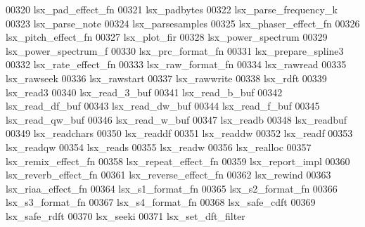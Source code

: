 \begin{DoxyCode}
00320 \textcolor{stringliteral}{lsx\_pad\_effect\_fn}
00321 \textcolor{stringliteral}{lsx\_padbytes}
00322 \textcolor{stringliteral}{lsx\_parse\_frequency\_k}
00323 \textcolor{stringliteral}{lsx\_parse\_note}
00324 \textcolor{stringliteral}{lsx\_parsesamples}
00325 \textcolor{stringliteral}{lsx\_phaser\_effect\_fn}
00326 \textcolor{stringliteral}{lsx\_pitch\_effect\_fn}
00327 \textcolor{stringliteral}{lsx\_plot\_fir}
00328 \textcolor{stringliteral}{lsx\_power\_spectrum}
00329 \textcolor{stringliteral}{lsx\_power\_spectrum\_f}
00330 \textcolor{stringliteral}{lsx\_prc\_format\_fn}
00331 \textcolor{stringliteral}{lsx\_prepare\_spline3}
00332 \textcolor{stringliteral}{lsx\_rate\_effect\_fn}
00333 \textcolor{stringliteral}{lsx\_raw\_format\_fn}
00334 \textcolor{stringliteral}{lsx\_rawread}
00335 \textcolor{stringliteral}{lsx\_rawseek}
00336 \textcolor{stringliteral}{lsx\_rawstart}
00337 \textcolor{stringliteral}{lsx\_rawwrite}
00338 \textcolor{stringliteral}{lsx\_rdft}
00339 \textcolor{stringliteral}{lsx\_read3}
00340 \textcolor{stringliteral}{lsx\_read\_3\_buf}
00341 \textcolor{stringliteral}{lsx\_read\_b\_buf}
00342 \textcolor{stringliteral}{lsx\_read\_df\_buf}
00343 \textcolor{stringliteral}{lsx\_read\_dw\_buf}
00344 \textcolor{stringliteral}{lsx\_read\_f\_buf}
00345 \textcolor{stringliteral}{lsx\_read\_qw\_buf}
00346 \textcolor{stringliteral}{lsx\_read\_w\_buf}
00347 \textcolor{stringliteral}{lsx\_readb}
00348 \textcolor{stringliteral}{lsx\_readbuf}
00349 \textcolor{stringliteral}{lsx\_readchars}
00350 \textcolor{stringliteral}{lsx\_readdf}
00351 \textcolor{stringliteral}{lsx\_readdw}
00352 \textcolor{stringliteral}{lsx\_readf}
00353 \textcolor{stringliteral}{lsx\_readqw}
00354 \textcolor{stringliteral}{lsx\_reads}
00355 \textcolor{stringliteral}{lsx\_readw}
00356 \textcolor{stringliteral}{lsx\_realloc}
00357 \textcolor{stringliteral}{lsx\_remix\_effect\_fn}
00358 \textcolor{stringliteral}{lsx\_repeat\_effect\_fn}
00359 \textcolor{stringliteral}{lsx\_report\_impl}
00360 \textcolor{stringliteral}{lsx\_reverb\_effect\_fn}
00361 \textcolor{stringliteral}{lsx\_reverse\_effect\_fn}
00362 \textcolor{stringliteral}{lsx\_rewind}
00363 \textcolor{stringliteral}{lsx\_riaa\_effect\_fn}
00364 \textcolor{stringliteral}{lsx\_s1\_format\_fn}
00365 \textcolor{stringliteral}{lsx\_s2\_format\_fn}
00366 \textcolor{stringliteral}{lsx\_s3\_format\_fn}
00367 \textcolor{stringliteral}{lsx\_s4\_format\_fn}
00368 \textcolor{stringliteral}{lsx\_safe\_cdft}
00369 \textcolor{stringliteral}{lsx\_safe\_rdft}
00370 \textcolor{stringliteral}{lsx\_seeki}
00371 \textcolor{stringliteral}{lsx\_set\_dft\_filter}

\end{DoxyCode}
